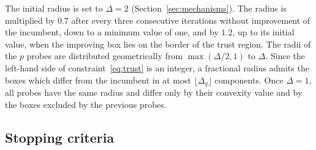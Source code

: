 \documentclass[pdflatex,sn-basic]{sn-jnl}
\begin{document}
The initial radius is set to $\Delta = 2$ (Section~\ref{sec:mechanisms}). The
radius is multiplied by $0.7$ after every three consecutive iterations without
improvement of the incumbent, down to a minimum value of one, and by $1.2$, up to
its initial value, when the improving box lies on the border of the trust
region. The radii of the $p$ probes are distributed geometrically from
$\max(\Delta/2, 1)$ to $\Delta$. Since the left-hand side of
constraint~\eqref{eq:trust} is an integer, a fractional radius admits the boxes
which differ from the incumbent in at most $\lfloor \Delta_q \rfloor$
components. Once $\Delta = 1$, all probes have the same radius and differ only by
their convexity value and by the boxes excluded by the previous probes.


\subsection{Stopping criteria}\label{sec:stopping}
\end{document}
